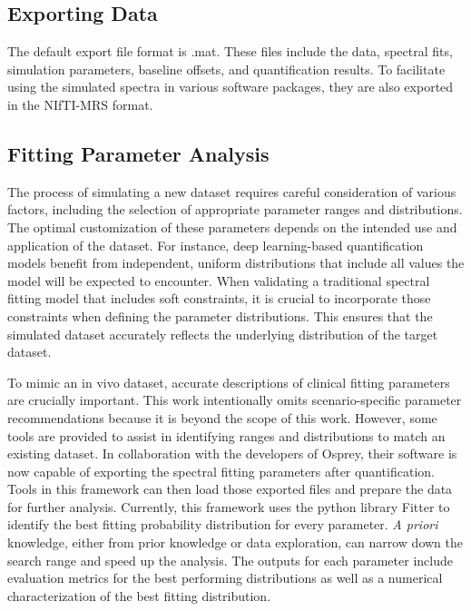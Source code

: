 

\subsection{Exporting Data}\label{subsec:exporting data}
The default export file format is .mat. These files include the data, spectral fits, simulation parameters, baseline offsets, and quantification results. To facilitate using the simulated spectra in various software packages, they are also exported in the NIfTI-MRS format\cite{Clarke2022}.
 
\subsection{Fitting Parameter Analysis}\label{subsec:Fitting Parameter Analysis}
The process of simulating a new dataset requires careful consideration of various factors, including the selection of appropriate parameter ranges and distributions. The optimal customization of these parameters depends on the intended use and application of the dataset. For instance, deep learning-based quantification models benefit from independent, uniform distributions that include all values the model will be expected to encounter. When validating a traditional spectral fitting model that includes soft constraints, it is crucial to incorporate those constraints when defining the parameter distributions. This ensures that the simulated dataset accurately reflects the underlying distribution of the target dataset. 

To mimic an in vivo dataset, accurate descriptions of clinical fitting parameters are crucially important. This work intentionally omits scenario-specific parameter recommendations because it is beyond the scope of this work. However, some tools are provided to assist in identifying ranges and distributions to match an existing dataset. In collaboration with the developers of Osprey\cite{Oeltzschner2020}, their software is now capable of exporting the spectral fitting parameters after quantification. Tools in this framework can then load those exported files and prepare the data for further analysis. Currently, this framework uses the python library Fitter\cite{Cokelaer2019} to identify the best fitting probability distribution for every parameter. \textit{A priori} knowledge, either from prior knowledge or data exploration, can narrow down the search range and speed up the analysis. The outputs for each parameter include evaluation metrics for the best performing distributions as well as a numerical characterization of the best fitting distribution.
 
